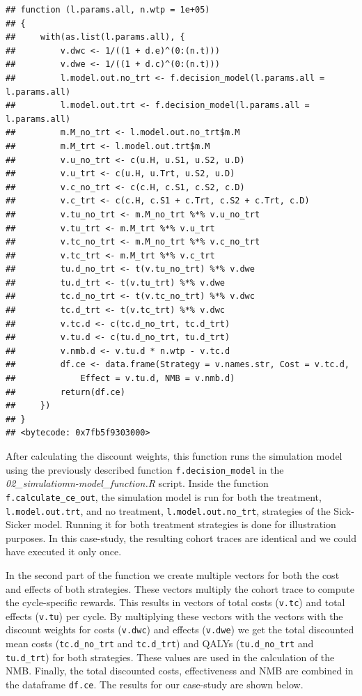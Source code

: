 \documentclass[]{article}
\begin{document}
\begin{verbatim}
## function (l.params.all, n.wtp = 1e+05) 
## {
##     with(as.list(l.params.all), {
##         v.dwc <- 1/((1 + d.e)^(0:(n.t)))
##         v.dwe <- 1/((1 + d.c)^(0:(n.t)))
##         l.model.out.no_trt <- f.decision_model(l.params.all = l.params.all)
##         l.model.out.trt <- f.decision_model(l.params.all = l.params.all)
##         m.M_no_trt <- l.model.out.no_trt$m.M
##         m.M_trt <- l.model.out.trt$m.M
##         v.u_no_trt <- c(u.H, u.S1, u.S2, u.D)
##         v.u_trt <- c(u.H, u.Trt, u.S2, u.D)
##         v.c_no_trt <- c(c.H, c.S1, c.S2, c.D)
##         v.c_trt <- c(c.H, c.S1 + c.Trt, c.S2 + c.Trt, c.D)
##         v.tu_no_trt <- m.M_no_trt %*% v.u_no_trt
##         v.tu_trt <- m.M_trt %*% v.u_trt
##         v.tc_no_trt <- m.M_no_trt %*% v.c_no_trt
##         v.tc_trt <- m.M_trt %*% v.c_trt
##         tu.d_no_trt <- t(v.tu_no_trt) %*% v.dwe
##         tu.d_trt <- t(v.tu_trt) %*% v.dwe
##         tc.d_no_trt <- t(v.tc_no_trt) %*% v.dwc
##         tc.d_trt <- t(v.tc_trt) %*% v.dwc
##         v.tc.d <- c(tc.d_no_trt, tc.d_trt)
##         v.tu.d <- c(tu.d_no_trt, tu.d_trt)
##         v.nmb.d <- v.tu.d * n.wtp - v.tc.d
##         df.ce <- data.frame(Strategy = v.names.str, Cost = v.tc.d, 
##             Effect = v.tu.d, NMB = v.nmb.d)
##         return(df.ce)
##     })
## }
## <bytecode: 0x7fb5f9303000>
\end{verbatim}

After calculating the discount weights, this function runs the
simulation model using the previously described function
\texttt{f.decision\_model} in the
\emph{02\_simulatiomn-model\_function.R} script. Inside the function
\texttt{f.calculate\_ce\_out}, the simulation model is run for both the
treatment, \texttt{l.model.out.trt}, and no treatment,
\texttt{l.model.out.no\_trt}, strategies of the Sick-Sicker model.
Running it for both treatment strategies is done for illustration
purposes. In this case-study, the resulting cohort traces are identical
and we could have executed it only once.

In the second part of the function we create multiple vectors for both
the cost and effects of both strategies. These vectors multiply the
cohort trace to compute the cycle-specific rewards. This results in
vectors of total costs (\texttt{v.tc}) and total effects (\texttt{v.tu})
per cycle. By multiplying these vectors with the vectors with the
discount weights for costs (\texttt{v.dwc}) and effects (\texttt{v.dwe})
we get the total discounted mean costs (\texttt{tc.d\_no\_trt} and
\texttt{tc.d\_trt}) and QALYs (\texttt{tu.d\_no\_trt} and
\texttt{tu.d\_trt}) for both strategies. These values are used in the
calculation of the NMB. Finally, the total discounted costs,
effectiveness and NMB are combined in the dataframe \texttt{df.ce}. The
results for our case-study are shown below.
\end{document}
